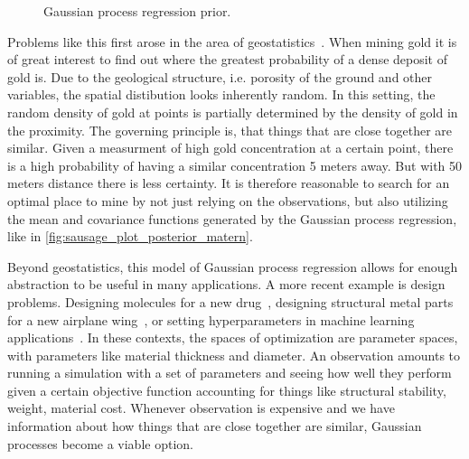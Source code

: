 
\begin{figure}[t]
    \centering
    
    \caption{Gaussian process regression prior.}
    \label{fig:sausage_plot_prior_matern}
\end{figure}

Problems like this first arose in the area of geostatistics~\cite{matheron1963principles}.
When mining gold it is of great interest to find out where the greatest probability of a dense deposit of gold is.
Due to the geological structure, i.e. porosity of the ground and other variables, the spatial distibution looks inherently random. 
In this setting, the random density of gold at points is partially determined by the density of gold in the proximity.
The governing principle is, that things that are close together are similar. 
Given a measurment of high gold concentration at a certain point, there is a high probability of having a similar concentration 5 meters away. 
But with 50 meters distance there is less certainty.
It is therefore reasonable to search for an optimal place to mine by not just relying on the observations, but also utilizing the mean and covariance functions generated by the Gaussian process regression, like in \cref{fig:sausage_plot_posterior_matern}.

Beyond geostatistics, this model of Gaussian process regression allows for enough abstraction to be useful in many applications. A more recent example is design problems. Designing molecules for a new drug~\cite{korovina2020chembo}, designing structural metal parts for a new airplane wing~\cite{sakata2003structural}, or setting hyperparameters in machine learning applications~\cite{wu2019hyperparameter}. 
In these contexts, the spaces of optimization are parameter spaces, with parameters like material thickness and diameter.
An observation amounts to running a simulation with a set of parameters and seeing how well they perform given a certain objective function accounting for things like structural stability, weight, material cost.  
Whenever observation is expensive and we have information about how things that are close together are similar, Gaussian processes become a viable option.





